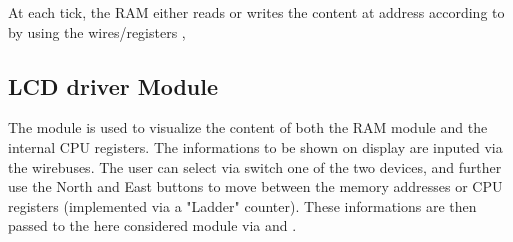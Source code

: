 At each  tick, the RAM either reads or writes the content at address  according to 
by using the wires/registers , 


\subsection{LCD driver Module}  \label{ssec:lcd}
The  module is used to visualize the content of both the RAM module and the internal CPU registers.
The informations to be shown on display are inputed via the  wirebuses.
The user can select via switch one of the two devices, and further use the North and East buttons to move between the memory addresses
or CPU registers (implemented via a "Ladder" counter).
These informations are then passed to the here considered module via  and .

